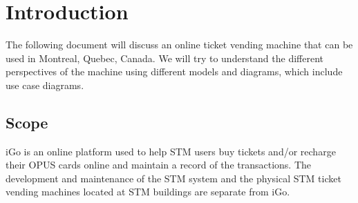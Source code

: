 \documentclass[a4paper,12pt]{article}
\begin{document}
\newcommand{\CC}{C\nolinebreak\hspace{-.05em}\raisebox{.4ex}{\tiny\bf +}\nolinebreak\hspace{-.10em}\raisebox{.4ex}{\tiny\bf +}}
\def\CC{{C\nolinebreak[4]\hspace{-.05em}\raisebox{.4ex}{\tiny\bf ++}}}

\tableofcontents
\newpage
\section{Introduction}
The following document will discuss an online ticket vending machine that can be used in Montreal, Quebec, Canada. We will try to understand the different perspectives of the machine using different models and diagrams, which include use case diagrams.
\subsection{Scope}
iGo is an online platform used to help STM users buy tickets and/or recharge their OPUS cards online and maintain a record of the transactions. The development and maintenance of the STM system and the physical STM ticket vending machines located at STM buildings are separate from iGo.
\end{document}

